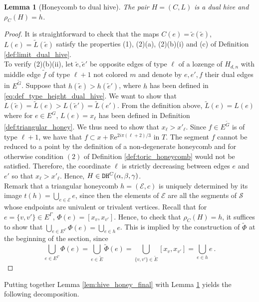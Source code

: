 \documentclass[11pt,a4paper]{amsart}
\providecommand{\ed}{\mathrm e}
\providecommand{\R}{\mathbb R}
\providecommand{\dualhive}{\texttt{\textsc{DH}}}
\numberwithin{equation}{section}
\newtheorem{lemma}[theorem]{Lemma}
\theoremstyle{definition}
\begin{document}
\begin{lemma}[Honeycomb to dual hive]
    \label{lem:honey_hive_final}
The pair $H=(C,L)$ is a dual hive and $\rho_{C}(H)=h$.
\end{lemma}
\begin{proof}
It is straightforward to check that the maps $C(e)=\tilde{c}(\tilde{e})$, 
$L(e)=\tilde{L}(\tilde{e})$ 
satisfy the properties (1), (2)(a), (2)(b)(i) and (c) of Definition \ref{def:limit_dual_hive}. 
\\
To verify (2)(b)(ii), let $\tilde{e},\tilde{e}'$ be opposite edges of type $\ell$ of a lozenge of 
$H_{d,n}$ with middle edge $\tilde{f}$ of type $\ell+1$ not colored $m$ and denote 
by $e,e',f$ their dual edges in $E^{\tilde{G}}$. 
Suppose that $h(\tilde{e})>h(\tilde{e}')$, where $h$ has been defined in 
\eqref{eq:def_type_height_dual_hive}. 
We want to show that $L(\tilde{e}) = \tilde{L}(e) > L(\tilde{e}') = \tilde{L}(e')$. From the 
definition above, $\tilde{L}(e) = L(e)$ where for $e \in E^G$, $L(e) = x_{\ell}$ 
has been defined in Definition \ref{def:triangular_honey}. We thus need to show that 
$x_{\ell} > x'_{\ell}$. Since $f \in E^{\tilde{G}}$ is of type $\ell + 1$, we have 
that $f \subset x + \R\ed^{2i \pi (\ell+2)/3}$ in $T$. 
The segment $f$ cannot be reduced to a point 
by the definition of a non-degenerate honeycomb and for otherwise condition $(2)$ of 
Definition \ref{def:toric_honeycomb} would not be satisfied. Therefore, the 
coordinate $\ell$ is strictly decreasing between edges $e$ and $e'$ so 
that $x_{\ell} > x'_{\ell}$. Hence, $H\in \dualhive^C(\alpha,\beta,\gamma)$.
\\
Remark that a triangular honeycomb $h=(\mathcal{E},c)$ is uniquely determined by its image 
$t(h)=\bigcup_{e\in \mathcal{E}}e$, 
since then the elements of $\mathcal{E}$ are all the segments of $\mathcal{S}$ whose 
endpoints are univalent or trivalent vertices. 
Recall that for $e = \{v, v'\} \in E^\Gamma$, $\Phi(e) = [x_v, x_{v'}]$.
Hence, to check that $\rho_C(H)=h$, it suffices to 
show that $\bigcup_{e\in E^\Gamma} \Phi(e)=\bigcup_{e\in h} e$. 
This is implied by the construction of $\tilde{\Phi}$ 
at the beginning of the section, since 
$$\bigcup_{e\in E^\Gamma}\Phi(e) = \bigcup_{e\in \tilde{E}}\tilde{\Phi}(e) 
= \bigcup_{ \{v, v'\} \in \tilde{E}} [x_v, x_{v'}]  = \bigcup_{e\in h}e \ .$$
\end{proof}

\noindent
Putting together Lemma \ref{lem:hive_honey_final} with Lemma \ref{lem:honey_hive_final} 
yields the following decomposition.
\end{document}

